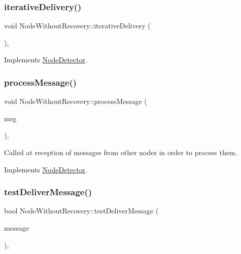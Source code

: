 \subsubsection{\texorpdfstring{iterative\+Delivery()}{iterativeDelivery()}}
{\footnotesize\ttfamily void Node\+Without\+Recovery\+::iterative\+Delivery (\begin{DoxyParamCaption}{ }\end{DoxyParamCaption})\hspace{0.3cm}{\ttfamily [protected]}, {\ttfamily [virtual]}}



Implements \hyperlink{class_node_detector_a17ecf9939fce7471f4513b66185743cc}{Node\+Detector}.

\mbox{\label{class_node_without_recovery_a0b44132b4ebc650399711766cb050399}} 
\subsubsection{\texorpdfstring{process\+Message()}{processMessage()}}
{\footnotesize\ttfamily void Node\+Without\+Recovery\+::process\+Message (\begin{DoxyParamCaption}\item[{c\+Message $\ast$}]{msg }\end{DoxyParamCaption})\hspace{0.3cm}{\ttfamily [protected]}, {\ttfamily [virtual]}}



Called at reception of messages from other nodes in order to process them. 



Implements \hyperlink{class_node_detector_ab69432c6d3327a684845ec231826727e}{Node\+Detector}.

\mbox{\label{class_node_without_recovery_a8cf83ec6d0af26e385dcde0bc03f5b6d}} 
\subsubsection{\texorpdfstring{test\+Deliver\+Message()}{testDeliverMessage()}}
{\footnotesize\ttfamily bool Node\+Without\+Recovery\+::test\+Deliver\+Message (\begin{DoxyParamCaption}\item[{const \hyperlink{structures_8h_a7e7bdc1d2fff8a9436f2f352b2711ed6}{message\+Info} \&}]{message }\end{DoxyParamCaption})\hspace{0.3cm}{\ttfamily [protected]}, {\ttfamily [virtual]}}



